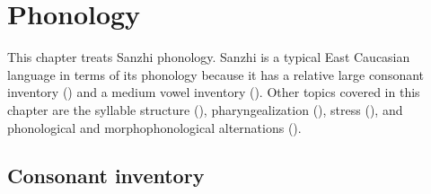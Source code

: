 \chapter{Phonology}
\label{cpt:phonology}

This chapter treats Sanzhi phonology. Sanzhi is a typical East Caucasian language in terms of its phonology because it has a relative large consonant inventory () and a medium vowel inventory (). Other topics covered in this chapter are the syllable structure (), pharyngealization (), stress (), and phonological and morphophonological alternations (). 



\section{Consonant inventory}
\label{sec:Consonant inventory}

